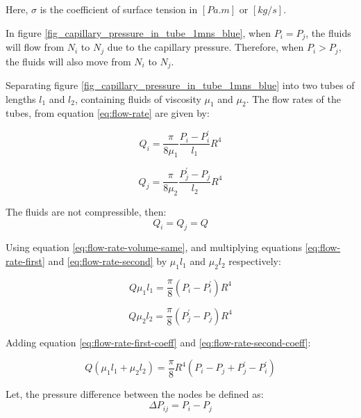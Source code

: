 	Here, $\sigma$ is the coefficient of surface tension in $[Pa.m]$ or $[kg/s]$.
	
	In figure \ref{fig_capillary_pressure_in_tube_1mns_blue}, when $P_{i} = P_{j}$, the fluids will flow from $N_{i}$ to $N_{j}$ due to the capillary pressure. Therefore, when $P_{i} > P_{j}$, the fluids will also move from $N_{i}$ to $N_{j}$.
		
	Separating figure \ref{fig_capillary_pressure_in_tube_1mns_blue} into two tubes of lengths $l_{1}$ and $l_{2}$, containing fluids of viscosity ${\mu}_1$ and ${\mu}_2$. The flow rates of the tubes, from equation \ref{eq:flow-rate} are given by:
	
	\begin{equation} \label{eq:flow-rate-first}
		Q_i = \frac{\pi}{8{\mu}_1} \frac{P_i - P^{'}_i}{l_1} R^4
	\end{equation}
	
	\begin{equation} \label{eq:flow-rate-second}
		Q_j = \frac{\pi}{8{\mu}_2} \frac{P^{'}_j - P_j}{l_2} R^4
	\end{equation}
	
	The fluids are not compressible, then:
	\begin{equation} \label{eq:flow-rate-volume-same}
		Q_i = Q_j = Q
	\end{equation}
	
	Using equation \ref{eq:flow-rate-volume-same}, and multiplying equations \ref{eq:flow-rate-first} and \ref{eq:flow-rate-second} by ${\mu}_1 l_1$ and ${\mu}_2 l_2$ respectively:
	
	\begin{equation} \label{eq:flow-rate-first-coeff}
		Q \mu_{1} l_1 = \frac{\pi}{8} (P_i - P^{'}_i) R^4
	\end{equation}
	
	\begin{equation} \label{eq:flow-rate-second-coeff}
		Q \mu_{2} l_2 = \frac{\pi}{8} (P^{'}_j - P_j) R^4
	\end{equation}

	Adding equation \ref{eq:flow-rate-first-coeff} and \ref{eq:flow-rate-second-coeff}:
	
	\begin{equation} \label{eq:flow-rate-intermediate}
		Q({\mu}_1 l_1 + {\mu}_2 l_2) = \frac{\pi}{8}R^4(P_i - P_j + P^{'}_j - P^{'}_i)
	\end{equation}
	
	Let, the pressure difference between the nodes be defined as:
	\begin{equation} \label{eq:def-pressure-difference} 
		\Delta P_{ij} = P_{i} - P_{j}
	\end{equation}
	
